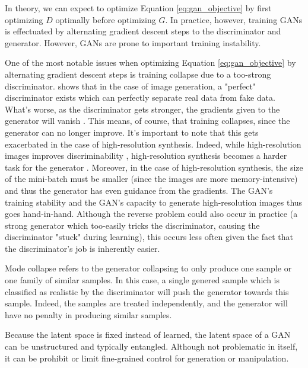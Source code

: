 In theory, we can expect to optimize Equation \ref{eq:gan_objective} by first optimizing $D$ 
optimally before optimizing $G$. In practice, however, training \ac{GAN}s is effectuated 
by alternating gradient descent steps to the discriminator and generator. 
However, GANs are prone to important training 
instability. 

One of the most notable issues when optimizing Equation \ref{eq:gan_objective} by alternating 
gradient descent steps is training collapse due to a too-strong discriminator. \cite{arjovsky2017towards}
shows that in the case of image generation, a "perfect" discriminator exists which can perfectly 
separate real data from fake data. What's worse, as the discriminator gets stronger, 
 the gradients  given to the generator will vanish \citep{arjovsky2017towards}. 
 This means, of course, that training collapses, since the generator can no longer improve. 
 It's important to note that this gets exacerbated in the case of high-resolution synthesis. 
 Indeed, while high-resolution images improves discriminability \citep{pmlr-v70-odena17a}, high-resolution 
 synthesis becomes a harder task for the generator \citep{karras2018progressive}. Moreover, in the case of 
 high-resolution synthesis, the size of the mini-batch must be smaller (since the images are more memory-intensive)
 and thus the generator has even guidance from the gradients. The \ac{GAN}'s training stability 
and the \ac{GAN}'s capacity to generate high-resolution images thus goes hand-in-hand. Although the 
reverse problem could also occur in practice (a strong generator which too-easily tricks the discriminator, causing 
the discriminator "stuck" during learning), 
this occurs less often given the fact that the discriminator's job is inherently easier.

 Mode collapse refers to the generator collapsing to only produce one sample or one family of
similar samples. In this case, a single genered sample which is classified as realistic by the discriminator will 
push the generator towards this sample. Indeed, the samples are treated independently, and the generator will have no penalty 
in producing similar samples. 

Because the latent space is fixed instead of learned, the latent space of a GAN can be unstructured 
and typically entangled. Although not problematic in itself, it can be prohibit or limit 
fine-grained control for generation or manipulation.

